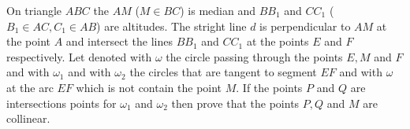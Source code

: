 On triangle $ABC$ the $AM$ ($M\in BC$) is median and $BB_1$ and $CC_1$ ($B_1 \in AC,C_1 \in AB$) are altitudes. The stright line $d$ is perpendicular to $AM$ at the point $A$ and intersect the lines $BB_1$ and $CC_1$ at the points $E$ and $F$ respectively. Let denoted with $\omega$ the circle passing through the points $E, M$ and $F$ and with $\omega_1$ and with $\omega_2$ the circles that are tangent to segment $EF$ and with $\omega$ at the arc $EF$ which is not contain the point $M$. If the points $P$ and $Q$ are intersections points for $\omega_1$ and $\omega_2$ then prove that the points $P, Q$ and $M$ are collinear.